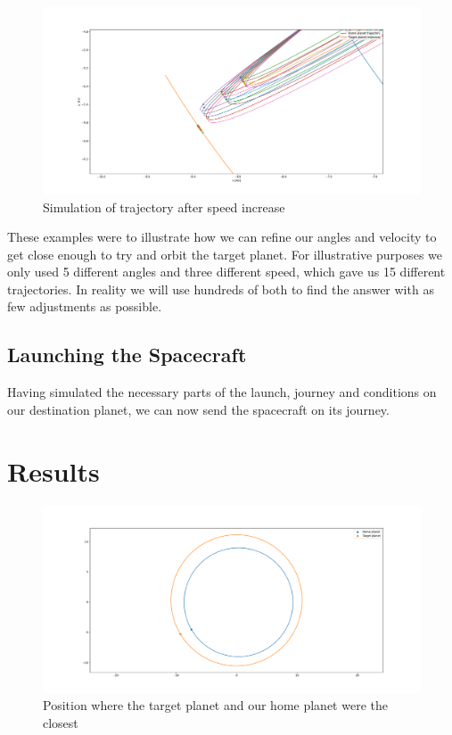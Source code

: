 \documentclass[reprint,english,notitlepage]{revtex4-2}
\begin{document}
\begin{figure}[h!]
  \centering
  \includegraphics[scale = .125]{Figures/post_speed_increase.pdf}
  \caption{Simulation of trajectory after speed increase}
  \label{fig: post speed increase}
\end{figure}

These examples were to illustrate how we can refine our angles and velocity to get close enough to try and orbit the target planet. For illustrative purposes we only used 5 different angles and three different speed, which gave us 15 different trajectories. In reality we will use hundreds of both to find the answer with as few adjustments as possible. 


\subsection{Launching the Spacecraft}\label{subsec:launching-the-spacecraft}
    Having simulated the necessary parts of the launch, journey and conditions on our destination planet, we can now send the spacecraft on its journey.


\section{Results} \label{sec: results}
\begin{figure}[h!]
  \centering
  \includegraphics[scale = .125]{Figures/closest_orbit.pdf}
  \caption{Position where the target planet and our home planet were the closest}
  \label{fig: closest orbit}
\end{figure}
\end{document}
